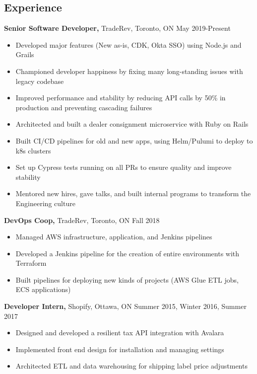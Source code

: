 \documentclass[line, centered]{res}
\begin{document}
\begin{resume}
\section{Experience}
 {\bf Senior Software Developer,} TradeRev, Toronto, ON \hfill May 2019-Present\\[-8pt]
 \begin{itemize} \itemsep -2pt
    \item Developed major features (New as-is, CDK, Okta SSO) using Node.js and Grails
    \item Championed developer happiness by fixing many long-standing issues with legacy codebase
    \item Improved performance and stability by reducing API calls by 50\% in production and preventing cascading failures
    \item Architected and built a dealer consignment microservice with Ruby on Rails
    \item Built CI/CD pipelines for old and new apps, using Helm/Pulumi to deploy to k8s clusters
    \item Set up Cypress tests running on all PRs to ensure quality and improve stability
    \item Mentored new hires, gave talks, and built internal programs to transform the Engineering culture
 \end{itemize}

 {\bf DevOps Coop,} TradeRev, Toronto, ON \hfill Fall 2018\\[-8pt]
 \begin{itemize} \itemsep -2pt  %
    \item Managed AWS infrastructure, application, and Jenkins pipelines
    \item Developed a Jenkins pipeline for the creation of entire environments with Terraform
    \item Built pipelines for deploying new kinds of projects (AWS Glue ETL jobs, ECS applications)
 \end{itemize}

 {\bf Developer Intern,} Shopify, Ottawa, ON \hfill Summer 2015, Winter 2016, Summer 2017\\[-8pt]
 \begin{itemize} \itemsep -2pt  %
    \item Designed and developed a resilient tax API integration with Avalara
    \item Implemented front end design for installation and managing settings
    \item Architected ETL and data warehousing for shipping label price adjustments
 \end{itemize}


\end{resume}
\end{document}
